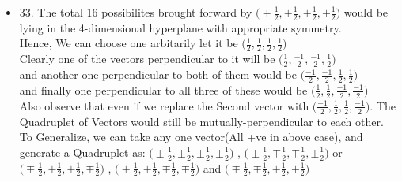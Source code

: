 \documentclass{article}
\begin{document}
\begin{itemize}
  \item 33. The total 16 possibilites brought forward by $\big(\pm \frac{1}{2}, \pm \frac{1}{2},\pm \frac{1}{2},\pm \frac{1}{2}\big)$ would be lying in the 4-dimensional hyperplane with appropriate symmetry. \\
  Hence, We can choose one arbitarily let it be $\big(\frac{1}{2},\frac{1}{2},\frac{1}{2},\frac{1}{2} \big)$ \\
  Clearly one of the vectors perpendicular to it will be $\big(\frac{1}{2},\frac{-1}{2},\frac{-1}{2},\frac{1}{2} \big)$ \\
  and another one perpendicular to both of them would be $\big(\frac{-1}{2},\frac{-1}{2},\frac{1}{2},\frac{1}{2} \big)$ \\
  and finally one perpendicular to all three of these would be $\big(\frac{1}{2},\frac{1}{2},\frac{-1}{2},\frac{-1}{2} \big)$\\
  Also observe that even if we replace the Second vector with $\big(\frac{-1}{2},\frac{1}{2},\frac{1}{2},\frac{-1}{2} \big)$. The Quadruplet of Vectors would still be mutually-perpendicular to each other.
  \\ To Generalize, we can take any one vector(All +ve in above case), and generate a Quadruplet as:
  $\big(\pm \frac{1}{2}, \pm \frac{1}{2},\pm \frac{1}{2},\pm \frac{1}{2}\big)$ , $\big(\pm \frac{1}{2}, \mp \frac{1}{2},\mp \frac{1}{2},\pm \frac{1}{2}\big)$ or $\big(\mp \frac{1}{2}, \pm \frac{1}{2},\pm \frac{1}{2},\mp \frac{1}{2}\big)$ , $\big(\pm \frac{1}{2}, \pm \frac{1}{2},\mp \frac{1}{2},\mp \frac{1}{2}\big)$ and $\big(\mp \frac{1}{2}, \mp \frac{1}{2},\pm \frac{1}{2},\pm \frac{1}{2}\big)$
\end{itemize}
\end{document}
